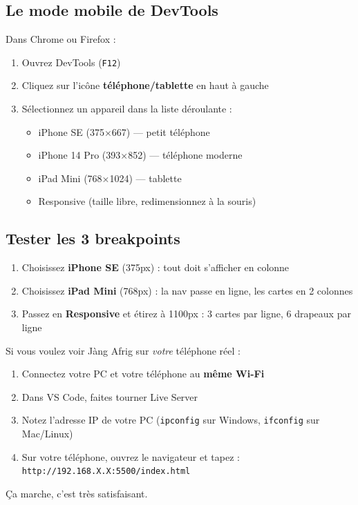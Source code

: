 \documentclass[11pt,a4paper]{article}
\begin{document}
\subsection{Le mode mobile de DevTools}

Dans Chrome ou Firefox :
\begin{enumerate}[nosep]
    \item Ouvrez DevTools (\texttt{F12})
    \item Cliquez sur l'icône \textbf{téléphone/tablette} en haut à gauche
    \item Sélectionnez un appareil dans la liste déroulante :
        \begin{itemize}[nosep]
            \item iPhone SE (375×667) --- petit téléphone
            \item iPhone 14 Pro (393×852) --- téléphone moderne
            \item iPad Mini (768×1024) --- tablette
            \item Responsive (taille libre, redimensionnez à la souris)
        \end{itemize}
\end{enumerate}

\subsection{Tester les 3 breakpoints}

\begin{enumerate}[nosep]
    \item Choisissez \textbf{iPhone SE} (375px) : tout doit s'afficher en colonne
    \item Choisissez \textbf{iPad Mini} (768px) : la nav passe en ligne, les cartes en 2 colonnes
    \item Passez en \textbf{Responsive} et étirez à 1100px : 3 cartes par ligne, 6 drapeaux par ligne
\end{enumerate}

\begin{infobox}
Si vous voulez voir Jàng Afrig sur \emph{votre} téléphone réel :
\begin{enumerate}[nosep]
    \item Connectez votre PC et votre téléphone au \textbf{même Wi-Fi}
    \item Dans VS Code, faites tourner Live Server
    \item Notez l'adresse IP de votre PC (\texttt{ipconfig} sur Windows, \texttt{ifconfig} sur Mac/Linux)
    \item Sur votre téléphone, ouvrez le navigateur et tapez : \texttt{http://192.168.X.X:5500/index.html}
\end{enumerate}
Ça marche, c'est très satisfaisant.
\end{infobox}
\end{document}

